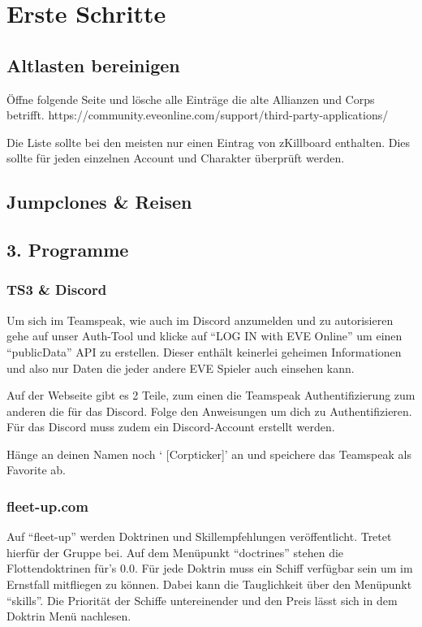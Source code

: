 \section{Erste Schritte}
\subsection{Altlasten bereinigen}
Öffne folgende Seite und lösche alle Einträge die alte Allianzen und Corps betrifft. https://community.eveonline.com/support/third-party-applications/

Die Liste sollte bei den meisten nur einen Eintrag von zKillboard enthalten.
Dies sollte für jeden einzelnen Account und Charakter überprüft werden.

\subsection{Jumpclones \& Reisen}

\subsection{3. Programme}

\subsubsection{TS3 \& Discord}

Um sich im Teamspeak, wie auch im Discord anzumelden und zu autorisieren gehe auf unser Auth-Tool und klicke auf “LOG IN with EVE Online” um einen “publicData” API zu erstellen. Dieser enthält keinerlei geheimen Informationen und also nur Daten die jeder andere EVE Spieler auch einsehen kann.

Auf der Webseite gibt es 2 Teile, zum einen die Teamspeak Authentifizierung zum anderen die für das Discord. Folge den Anweisungen um dich zu Authentifizieren. Für das Discord muss zudem ein Discord-Account erstellt werden.

Hänge an deinen Namen noch ‘ [Corpticker]’ an und speichere das Teamspeak als Favorite ab.


\subsubsection{fleet-up.com}

Auf “fleet-up” werden Doktrinen und Skillempfehlungen veröffentlicht. Tretet hierfür der Gruppe bei.
Auf dem Menüpunkt “doctrines” stehen die Flottendoktrinen für’s 0.0. Für jede Doktrin muss ein Schiff verfügbar sein um im Ernstfall mitfliegen zu können. Dabei kann die Tauglichkeit über den Menüpunkt “skills”. Die  Priorität der Schiffe untereinender und den Preis lässt sich in dem Doktrin Menü nachlesen.

